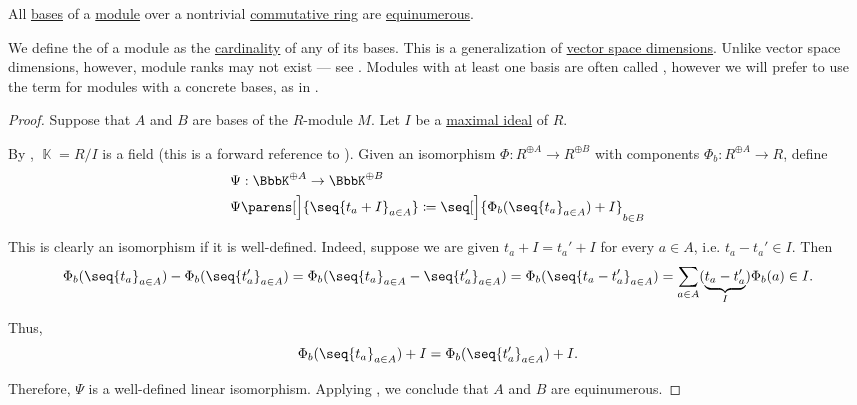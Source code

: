 \begin{proposition}\label{thm:commutative_module_rank}
  All \hyperref[def:hamel_basis]{bases} of a \hyperref[def:module]{module} over a nontrivial \hyperref[def:ring/commutative]{commutative ring} are \hyperref[def:equinumerosity]{equinumerous}.

  We define the  of a module as the \hyperref[thm:cardinality_existence]{cardinality} of any of its bases. This is a generalization of \hyperref[thm:vector_space_dimension]{vector space dimensions}. Unlike vector space dimensions, however, module ranks may not exist --- see . Modules with at least one basis are often called , however we will prefer to use the term for modules with a concrete bases, as in .
\end{proposition}
\begin{proof}
  Suppose that \( A \) and \( B \) are bases of the \( R \)-module \( M \). Let \( I \) be a \hyperref[def:semiring_ideal/maximal]{maximal ideal} of \( R \).

  By , \( \BbbK = R / I \) is a field (this is a forward reference to ). Given an isomorphism \( \Phi: R^{\oplus A} \to R^{\oplus B} \) with components \( \Phi_b: R^{\oplus A} \to R \), define
  \begin{equation*}
    \begin{aligned}
      &\Psi: \BbbK^{\oplus A} \to \BbbK^{\oplus B} \\
      &\Psi\parens[\Big]{ \seq{ t_a + I }_{a \in A} } \coloneqq \seq[\Big]{ \Phi_b(\seq{ t_a }_{a \in A}) + I }_{b \in B}
    \end{aligned}
  \end{equation*}

  This is clearly an isomorphism if it is well-defined. Indeed, suppose we are given \( t_a + I = t_a' + I \) for every \( a \in A \), i.e. \( t_a - t_a' \in I \). Then
  \small
  \begin{equation*}
    \Phi_b(\seq{ t_a }_{a \in A}) - \Phi_b(\seq{ t_a' }_{a \in A})
    =
    \Phi_b(\seq{ t_a }_{a \in A} - \seq{ t_a' }_{a \in A})
    =
    \Phi_b(\seq{ t_a - t_a' }_{a \in A})
    =
    \sum_{a \in A} (\underbrace{ t_a - t_a' }_I) \Phi_b(a)
    \in
    I.
  \end{equation*}
  \normalsize

  Thus,
  \begin{equation*}
    \Phi_b(\seq{ t_a }_{a \in A}) + I = \Phi_b(\seq{ t_a' }_{a \in A}) + I.
  \end{equation*}

  Therefore, \( \Psi \) is a well-defined linear isomorphism. Applying , we conclude that \( A \) and \( B \) are equinumerous.
\end{proof}

